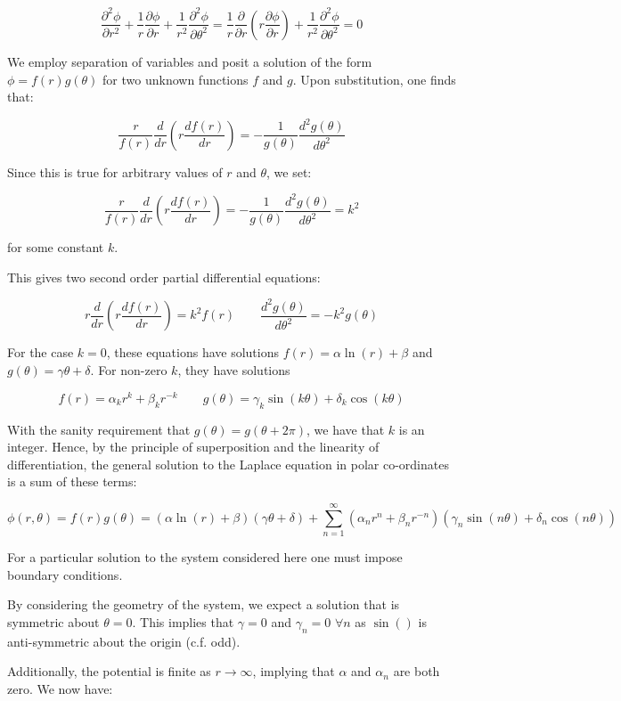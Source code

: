 \documentclass{article}
\newcommand{\be}{\begin{equation}}
\newcommand{\ee}{\end{equation}}
\begin{document}
\be
\frac{\partial^2 \phi}{\partial r^2}+\frac{1}{r}\frac{\partial \phi}{\partial r}+\frac{1}{r^2}\frac{\partial^2 \phi}{\partial \theta^2}
= \frac{1}{r}\frac{\partial}{\partial r}(r \frac{\partial \phi}{\partial r}) + \frac{1}{r^2}\frac{\partial ^2 \phi}{\partial \theta^2}
= 0
\ee

We employ separation of variables and posit a solution of the form
$\phi = f(r)g(\theta)$ for two unknown functions $f$ and $g$. Upon substitution,
one finds that:

\be
\frac{r}{f(r)}\frac{d}{dr}(r \frac{df(r)}{dr}) =- \frac{1}{g(\theta)}\frac{d^2 g(\theta)}{d\theta^2}
\ee

Since this is true for arbitrary values of $r$ and $\theta$, we set:

\be
\frac{r}{f(r)}\frac{d}{dr}(r \frac{df(r)}{dr}) =- \frac{1}{g(\theta)}\frac{d^2 g(\theta)}{d\theta^2}=k^2
\ee

for some constant $k$.

This gives two second order partial differential equations:

\be
r\frac{d}{dr}(r \frac{df(r)}{dr}) = k^2 f(r) \qquad
\frac{d^2 g(\theta)}{d\theta^2}=-k^2 g(\theta)
\ee

For the case $k=0$, these equations have solutions
$f(r)=\alpha \ln(r) + \beta$ and $g(\theta) = \gamma \theta + \delta$.
For non-zero $k$, they have solutions

\be
f(r)=\alpha_k r^k + \beta_k r^{-k}
\qquad
g(\theta)= \gamma_k \sin(k\theta)+\delta_k \cos(k\theta)
\ee

With the sanity requirement that $g(\theta)=g(\theta + 2\pi)$, we have that $k$ is
an integer. Hence, by the principle of superposition and the linearity of differentiation,
the general solution to the Laplace equation in polar co-ordinates is a sum of
these terms:

\be
\phi(r,\theta)
= f(r)g(\theta)
= (\alpha \ln(r) + \beta)(\gamma\theta + \delta) + \sum_{n=1}^{\infty}(\alpha_n r^n+\beta_n r^{-n})(\gamma_n \sin(n\theta) + \delta_n \cos(n\theta))
\ee

For a particular solution to the system considered here one must impose boundary
conditions.

By considering the geometry of the system, we expect a solution that is symmetric
about $\theta=0$. This implies that $\gamma = 0$ and $\gamma_n=0$ $\forall n$ as
$\sin()$ is anti-symmetric about the origin (c.f. odd).

Additionally, the potential is finite as $r \rightarrow \infty$, implying that
$\alpha$ and $\alpha_n$ are both zero. We now have:
\end{document}
